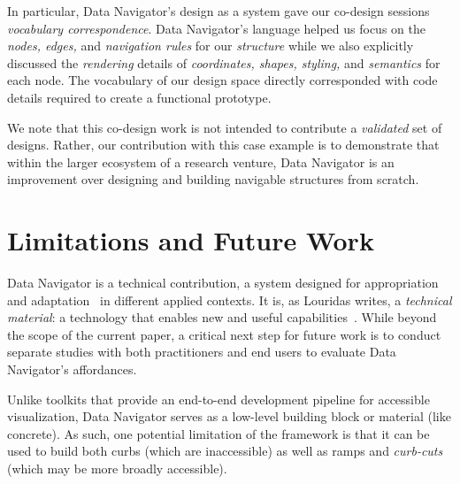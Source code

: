 \documentclass[12pt]{cmuthesis}
\begin{document}
In particular, Data Navigator's design as a system gave our co-design sessions \textit{vocabulary correspondence}. Data Navigator's language helped us focus on the \textit{nodes, edges,} and \textit{navigation rules} for our \textit{structure} while we also explicitly discussed the \textit{rendering} details of \textit{coordinates, shapes, styling,} and \textit{semantics} for each node. The vocabulary of our design space directly corresponded with code details required to create a functional prototype.


We note that this co-design work is not intended to contribute a \textit{validated} set of designs. Rather, our contribution with this case example is to demonstrate that within the larger ecosystem of a research venture, Data Navigator is an improvement over designing and building navigable structures from scratch.

\section{Limitations and Future Work}
Data Navigator is a technical contribution, a system designed for appropriation~\cite{Dourish2003Appropriation} and adaptation~\cite{Wobbrock2011Ability} in different applied contexts. It is, as Louridas writes, a \textit{technical material}: a technology that enables new and useful capabilities~\cite{Louridas1999Bricolage}. While beyond the scope of the current paper, a critical next step for future work is to conduct separate studies with both practitioners and end users to evaluate Data Navigator's affordances.

Unlike toolkits that provide an end-to-end development pipeline for accessible visualization, Data Navigator serves as a low-level building block or material (like concrete). As such, one potential limitation of the framework is that it can be used to build both curbs (which are inaccessible) as well as ramps and \textit{curb-cuts} (which may be more broadly accessible).
\end{document}
